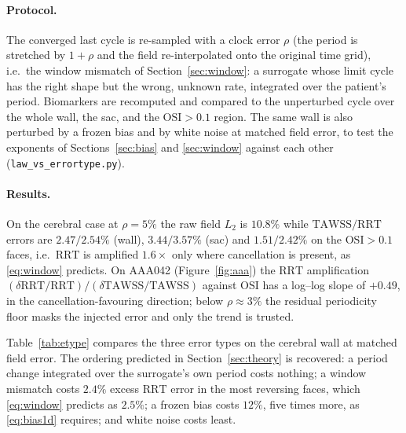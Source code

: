\documentclass[11pt,a4paper]{article}
\newcommand{\TAWSS}{\mathrm{TAWSS}}
\newcommand{\OSI}{\mathrm{OSI}}
\newcommand{\RRT}{\mathrm{RRT}}
\begin{document}
\paragraph{Protocol.}
The converged last cycle is re-sampled with a clock error $\rho$ (the period
is stretched by $1+\rho$ and the field re-interpolated onto the original time
grid), i.e.\ the window mismatch of Section~\ref{sec:window}: a surrogate
whose limit cycle has the right shape but the wrong, unknown rate, integrated
over the patient's period. Biomarkers are recomputed and compared to the
unperturbed cycle over the whole wall, the sac, and the $\OSI>0.1$ region.
The same wall is also perturbed by a frozen bias and by white noise at
matched field error, to test the exponents of
Sections~\ref{sec:bias} and \ref{sec:window} against each other
(\texttt{law\_vs\_errortype.py}).

\paragraph{Results.}
On the cerebral case at $\rho=5\%$ the raw field $L_2$ is $10.8\%$ while
$\TAWSS/\RRT$ errors are $2.47/2.54\%$ (wall), $3.44/3.57\%$ (sac) and
$1.51/2.42\%$ on the $\OSI>0.1$ faces, i.e.\ $\RRT$ is amplified $1.6\times$
only where cancellation is present, as \eqref{eq:window} predicts. On AAA042
(Figure~\ref{fig:aaa}) the $\RRT$ amplification $(\delta\RRT/\RRT)/
(\delta\TAWSS/\TAWSS)$ against $\OSI$ has a log--log slope of $+0.49$, in
the cancellation-favouring direction; below $\rho\approx3\%$ the residual
periodicity floor masks the injected error and only the trend is trusted.

Table~\ref{tab:etype} compares the three error types on the cerebral wall at
matched field error. The ordering predicted in Section~\ref{sec:theory} is
recovered: a period change integrated over the surrogate's own period costs
nothing; a window mismatch costs $2.4\%$ excess $\RRT$ error in the most
reversing faces, which \eqref{eq:window} predicts as $2.5\%$; a frozen bias
costs $12\%$, five times more, as \eqref{eq:bias1d} requires; and white noise
costs least.
\end{document}
